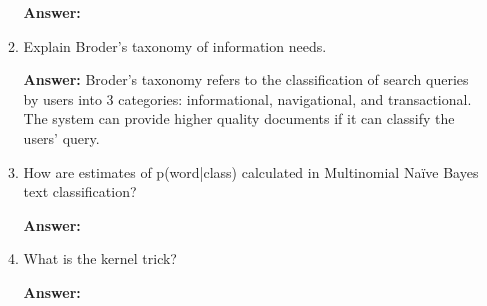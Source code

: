 \documentclass[11pt]{article}
\begin{document}
\begin{enumerate}
\begin{enumerate}
                \textbf{Answer:}

          \item Explain Broder's taxonomy of information needs.

                \textbf{Answer:} Broder's taxonomy refers to the classification of search queries by users into 3 categories: informational, navigational, and transactional. The system can provide higher quality documents if it can classify the users' query.

          \item How are estimates of p(word|class) calculated in Multinomial Naïve Bayes text classification?

                \textbf{Answer:}

          \item What is the kernel trick?

                \textbf{Answer:}

        \end{enumerate}

\end{enumerate}
\end{document}
